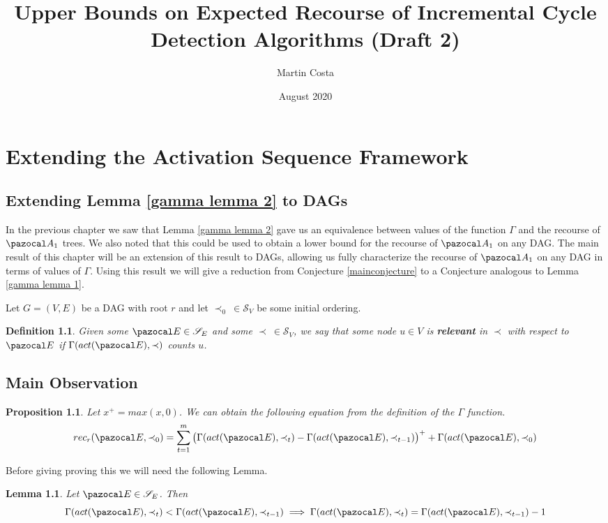 \documentclass{report}
\title{Upper Bounds on Expected Recourse of Incremental Cycle Detection Algorithms (Draft 2)}
\author{Martin Costa}
\date{August 2020}
\newtheorem{lemma}{Lemma}
\newtheorem{proposition}{Proposition}
\newtheorem{definition}{Definition}
\begin{document}
\chapter{Extending the Activation Sequence Framework}

\section{Extending Lemma \ref{gamma lemma 2} to DAGs}

In the previous chapter we saw that Lemma \ref{gamma lemma 2} gave us an equivalence between values of the function $\Gamma$ and the recourse of $\pazocal A_1$ trees. We also noted that this could be used to obtain a lower bound for the recourse of $\pazocal A_1$ on any DAG. The main result of this chapter will be an extension of this result to DAGs, allowing us fully characterize the recourse of $\pazocal A_1$ on any DAG in terms of values of $\Gamma$. Using this result we will give a reduction from Conjecture \ref{mainconjecture} to a Conjecture analogous to Lemma \ref{gamma lemma 1}. 

Let $G=(V,E)$ be a DAG with root $r$ and let $\prec_0 \: \in \mathcal S_V$ be some initial ordering.

\begin{definition}
Given some $\pazocal E \in \mathcal S_E$ and some $\prec \: \in \mathcal S_V$, we say that some node $u \in V$ is \textbf{relevant} in $\prec$ with respect to $\pazocal E$ if $\Gamma(act(\pazocal E), \prec)$ counts $u$.
\end{definition}

\section{Main Observation}

\begin{proposition}\label{mainobservation} Let $x^+=max(x,0)$. We can obtain the following equation from the definition of the $\Gamma$ function.
\[ rec_r(\pazocal E, \prec_0) =  \sum_{t=1}^{m}\big(\Gamma(act(\pazocal E), \prec_{t}) - \Gamma(act(\pazocal E), \prec_{t-1})\big)^+ + \Gamma(act(\pazocal E), \prec_0) \]
\end{proposition}

Before giving proving this we will need the following Lemma.

\begin{lemma} Let $\pazocal E \in \mathcal S_E$. Then
\[ \Gamma(act(\pazocal E), \prec_{t}) < \Gamma(act(\pazocal E), \prec_{t-1}) \implies \Gamma(act(\pazocal E), \prec_{t}) = \Gamma(act(\pazocal E), \prec_{t-1}) - 1  \]
\end{lemma}
\end{document}
